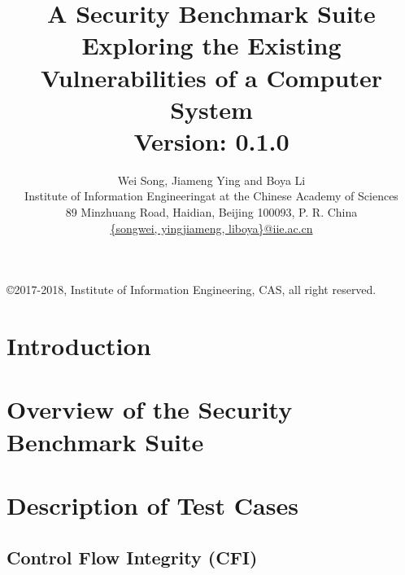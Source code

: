 \documentclass[a4paper]{book}
\begin{document}
\title{\textbf{A Security Benchmark Suite Exploring the Existing Vulnerabilities of a Computer System} \\ \large{Version: 0.1.0}}

\author{Wei Song, Jiameng Ying and Boya Li\\
\small{Institute of Information Engineeringat at the Chinese Academy of Sciences}\\
\small{89 Minzhuang Road, Haidian, Beijing 100093, P. R. China}\\
\small{\url{{songwei, yingjiameng, liboya}@iie.ac.cn}}}

\maketitle

\copyright 2017-2018, Institute of Information Engineering, CAS, all right reserved.

\tableofcontents
\newpage

\chapter{Introduction}

\chapter{Overview of the Security Benchmark Suite}

\chapter{Description of Test Cases}

\section{Control Flow Integrity (CFI)}
\end{document}

